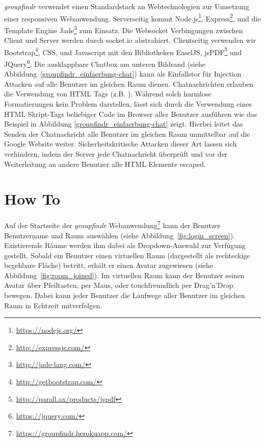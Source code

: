 \emph{groupfindr} verwendet einen Standardstack an Webtechnologien zur Umsetzung einer responsiven Webanwendung. Serverseitig kommt Node.js\footnote{\url{https://nodejs.org/}}, Express\footnote{\url{http://expressjs.com/}}, und die Template Engine Jade\footnote{\url{http://jade-lang.com/}} zum Einsatz. Die Websocket Verbingungen zwischen Client und Server werden durch socket.io abstrahiert. Clientseitig verwenden wir Bootstrap\footnote{\url{http://getbootstrap.com/}}, CSS, und Javascript mit den Bibliotheken EaselJS, jsPDF\footnote{\url{http://parall.ax/products/jspdf}} und JQuery\footnote{\url{https://jquery.com/}}.
\newline\newline
Die ausklappbare Chatbox am unteren Bildrand (siehe Abbildung~\ref{groupfindr_einfaerbung-chat}) kann als Einfallstor für Injection Attacken auf alle Benutzer im gleichen Raum dienen. Chatnachrichten erlauben die Verwendung von HTML Tags (z.B. ). Während solch harmlose Formatierungen kein Problem darstellen, lässt sich durch die Verwendung eines HTML Skript-Tags beliebiger Code im Browser aller Benutzer ausführen wie das Beispiel in Abbildung \ref{groupfindr_einfaerbung-chat} zeigt. Hierbei leitet das Senden der Chatnachricht  alle Benutzer im gleichen Raum unmittelbar auf die Google Website weiter. Sicherheitskritische Attacken dieser Art lassen sich verhindern, indem der Server jede Chatnachricht überprüft und vor der Weiterleitung an andere Benutzer alle HTML Elemente escaped.

\section{How To}
\label{how_to}

Auf der Startseite der \emph{groupfindr} Webanwendung\footnote{\url{https://groupfindr.herokuapp.com/}} kann der Benutzer Benutzername und Raum auswählen (siehe Abbildung~\ref{fig:login_screen}). Existierende Räume werden ihm dabei als Dropdown-Auswahl zur Verfügung gestellt. Sobald ein Benutzer einen virtuellen Raum (dargestellt als rechteckige begehbare Fläche) betritt, erhält er einen Avatar zugewiesen (siehe Abbildung~\ref{fig:room_joined}). Im virtuellen Raum kann der Benutzer seinen Avatar über Pfeiltasten, per Maus, oder touchfreundlich per Drag’n’Drop bewegen. Dabei kann jeder Benutzer die Laufwege aller Benutzer im gleichen Raum in Echtzeit mitverfolgen.

